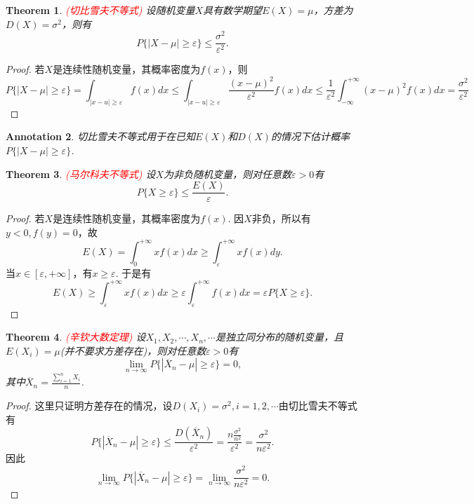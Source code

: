 \documentclass{article}
\newtheorem{theorem}{Theorem}[section]
\newtheorem{annotation}[theorem]{Annotation}
\newcommand{\redt}[1]{\textcolor{red}{#1}}
\begin{document}
\begin{theorem}
\rm \redt{(切比雪夫不等式)} 设随机变量$X$具有数学期望$E(X)=\mu$，方差为$D(X) = \sigma^2$，则有
$$
P\{|X-\mu| \geq \varepsilon \} \leq \frac{\sigma^2}{\varepsilon^2}. 
$$
\end{theorem}

\begin{proof}
若$X$是连续性随机变量，其概率密度为$f(x)$，则
$$
P\{|X-\mu| \geq \varepsilon \} = \int_{|x-u| \geq \varepsilon} f(x)dx \leq \int_{|x-u| \geq \varepsilon} \frac{(x-\mu)^2}{\varepsilon^2}f(x)dx \leq \frac{1}{\varepsilon^2}\int_{-\infty}^{+\infty}(x-\mu)^2f(x)dx =\frac{\sigma^2}{\varepsilon^2}
$$
\end{proof}

\begin{annotation}
\rm 切比雪夫不等式用于在已知$E(X)$和$D(X)$的情况下估计概率$P\{|X-\mu|\geq \varepsilon\}$. 
\end{annotation}

\begin{theorem}
\rm \redt{(马尔科夫不等式)} 设$X$为非负随机变量，则对任意数$\varepsilon > 0$有
$$
P\{X \geq \varepsilon\} \leq \frac{E(X)}{\varepsilon}.
$$
\end{theorem}

\begin{proof}
若$X$是连续性随机变量，其概率密度为$f(x)$. 因$X$非负，所以有$y < 0,f(y)=0$，故
$$
E(X) = \int_{0}^{+\infty} xf(x)dx \geq  \int_{\varepsilon}^{+\infty} xf(x)dy.
$$
当$x \in [\varepsilon,+\infty]$，有$x \geq \varepsilon$. 于是有
$$
E(X) \geq \int_{\varepsilon}^{+\infty} xf(x)dx \geq \varepsilon \int_{\varepsilon}^{+\infty}f(x)dx = \varepsilon P\{X \geq \varepsilon\}.
$$
\end{proof}

\begin{theorem}
\rm \redt{(辛钦大数定理)} 设$X_1,X_2,\cdots,X_n,\cdots$是独立同分布的随机变量，且$E(X_i) = \mu$(并不要求方差存在)，则对任意数$\varepsilon > 0$有
$$
\lim\limits_{n \rightarrow \infty}P\{|\overline{X}_n -\mu| \geq \varepsilon\} = 0,
$$ 
其中$\overline{X}_n = \frac{\sum\limits_{i=1}^n X_i}{n}$. 
\end{theorem}

\begin{proof}
这里只证明方差存在的情况，设$D(X_i)=\sigma^2, i=1,2,\cdots$由切比雪夫不等式有
$$
P\{|\overline{X}_n -\mu| \geq \varepsilon\} \leq \frac{D(\overline{X}_n)}{\varepsilon^2} = \frac{n\frac{\sigma^2}{n^2}}{\varepsilon^2} = \frac{\sigma^2}{n\varepsilon^2}. 
$$
因此
$$
\lim\limits_{n \rightarrow \infty} P\{|\overline{X}_n -\mu| \geq \varepsilon\} = \lim\limits_{n \rightarrow \infty} \frac{\sigma^2}{n\varepsilon^2} = 0.
$$
\end{proof}
\end{document}
